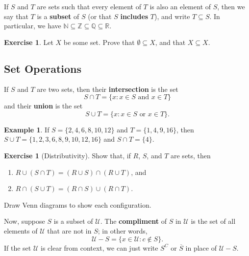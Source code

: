 \documentclass[a4paper,leqno]{article}
\numberwithin{equation}{section}
\theoremstyle{definition}
\newtheorem{ex}[equation]{Example}
\newtheorem{exercise}[equation]{Exercise}
\theoremstyle{remark}
\newcommand{\df}[1]{\textbf{#1}}
\begin{document}
If $ S $ and $ T $ are sets such that every element of $ T $ is also an element of $ S $, then we say that $ T $ is a \df{subset} of $ S $ (or
that $ S $ \df{includes} $ T $), and write $ T \subseteq S $. In particular, we have $ \mathbb{N} \subseteq \mathbb{Z} \subseteq \mathbb{Q} \subseteq \mathbb{R} $.
\begin{exercise}
  Let $ X $ be some set. Prove that $ \emptyset \subseteq X $, and that $ X \subseteq X $.
\end{exercise}

\subsection{Set Operations}
If $ S $ and $ T $ are two sets, then their \df{intersection} is the set
\begin{equation}
  S \cap T = \{ x : x \in S \text{ and } x \in T \}
\end{equation}
and their \df{union} is the set
\begin{equation}
  S \cup T = \{ x : x \in S \text{ or } x \in T \}.
\end{equation}

\begin{ex}
  If $ S = \{2, 4, 6, 8, 10, 12\} $ and $ T = \{1, 4, 9, 16\} $, then $ S \cup T = \{1,2,3,6,8,9,10,12,16\} $ and $ S \cap T = \{4\} $.
\end{ex}

\begin{exercise}[Distributivity]
  Show that, if $ R $, $ S $, and $ T $ are sets, then
  \begin{enumerate}
    \item $ R \cup (S \cap T) = (R \cup S) \cap (R \cup T) $, and
    \item $ R \cap (S \cup T) = (R \cap S) \cup (R \cap T) $.
  \end{enumerate}
  Draw Venn diagrams to show each configuration.
\end{exercise}

Now, suppose $ S $ is a subset of $ \mathcal{U} $. The \df{compliment} of $ S $ in $ \mathcal{U} $ is the set of
all elements of $ \mathcal{U} $ that are not in $ S $; in other words,
\begin{equation}
  \mathcal{U} - S = \{ x \in \mathcal{U} : c \notin S\}.
\end{equation}
If the set $ \mathcal{U} $ is clear from context, we can just write $ S^C $ or $ \overline{S} $ in place of $ \mathcal{U} - S $.
\end{document}
